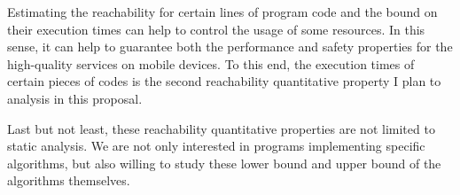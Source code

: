 {%
Estimating the reachability for certain lines of program code and the bound on their execution times
can help to control the usage of some resources.
In this sense, it can help to guarantee both the performance and safety properties for
the high-quality services
on mobile devices.
To this end, the execution times of certain pieces of codes is
the second reachability quantitative property I plan to analysis in this proposal.
}


Last but not least, these reachability quantitative properties are not limited to static analysis.
We are not only interested in programs implementing
specific algorithms, but also willing to study these lower bound and upper bound of the algorithms themselves.

